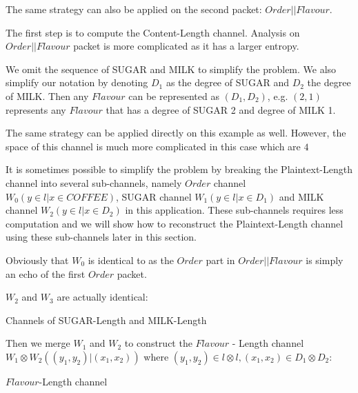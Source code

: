 The same strategy can also be applied on the second packet: $Order || Flavour$.

\begin{example}
The first step is to compute the Content-Length channel. Analysis on $Order||Flavour$ packet is more complicated as it has a larger entropy. 

We omit the sequence of SUGAR and MILK to simplify the problem. We also simplify our notation by denoting $D_1$ as the degree of SUGAR and $D_2$ the degree of MILK. Then any $Flavour$ can be represented as $(D_1, D_2)$, e.g. $(2,1)$ represents any $Flavour$ that has a degree of SUGAR 2 and degree of MILK 1.

The same strategy can be applied directly on this example as well. However, the space of this channel is much more complicated in this case which are $4 $

It is sometimes possible to simplify the problem by breaking the Plaintext-Length channel into several sub-channels, namely $Order$ channel $W_{0}(y \in l|x \in COFFEE)$, SUGAR channel $W_{1}(y \in l| x \in D_1)$ and MILK channel $W_{2}(y \in l | x \in D_2)$ in this application. These sub-channels requires less computation and we will show how to reconstruct the Plaintext-Length channel using these sub-channels later in this section. 

Obviously that $W_0$ is identical to  as the $Order$ part in $Order||Flavour$ is simply an echo of the first $Order$ packet. 

$W_2$ and $W_3$ are actually identical:

\begin{table}[H]
\begin{center}
{}
{}
\end{center}
\caption{Channels of SUGAR-Length and MILK-Length}
\label{Tbl: SUGAR-Length and MILK-Length}
\end{table}

Then we merge $W_1$ and $W_2$ to construct the $Flavour$ - Length channel $W_1 \otimes W_2((y_1, y_2) |(x_1, x_2))$ where $(y_1, y_2) \in l \otimes l, (x_1, x_2) \in D_1 \otimes D_2$:

\begin{table}[H]
\begin{center}
{}
\end{center}
\caption{$Flavour$-Length channel}
\label{Tbl: Flavour channel}
\end{table}


\end{example}
